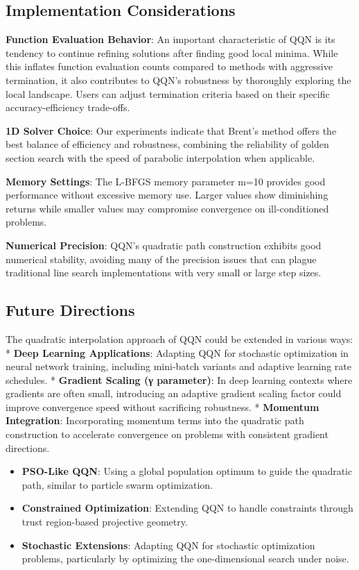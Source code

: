 \hypertarget{implementation-considerations}{%
\subsection{Implementation Considerations}\label{implementation-considerations}}

\textbf{Function Evaluation Behavior}: An important characteristic of QQN is its tendency to continue refining solutions after finding good local minima.
While this inflates function evaluation counts compared to methods with aggressive termination, it also contributes to QQN's robustness by thoroughly exploring the local landscape.
Users can adjust termination criteria based on their specific accuracy-efficiency trade-offs.

\textbf{1D Solver Choice}: Our experiments indicate that Brent's method offers the best balance of efficiency and robustness, combining the reliability of golden section search with the speed of parabolic interpolation when applicable.

\textbf{Memory Settings}: The L-BFGS memory parameter m=10 provides good performance without excessive memory use.
Larger values show diminishing returns while smaller values may compromise convergence on ill-conditioned problems.

\textbf{Numerical Precision}: QQN's quadratic path construction exhibits good numerical stability, avoiding many of the precision issues that can plague traditional line search implementations with very small or large step sizes.

\hypertarget{future-directions}{%
\subsection{Future Directions}\label{future-directions}}

The quadratic interpolation approach of QQN could be extended in various ways:
* \textbf{Deep Learning Applications}: Adapting QQN for stochastic optimization in neural network training, including mini-batch variants and adaptive learning rate schedules.
* \textbf{Gradient Scaling (γ parameter)}: In deep learning contexts where gradients are often small, introducing an adaptive gradient scaling factor could improve convergence speed without sacrificing robustness.
* \textbf{Momentum Integration}: Incorporating momentum terms into the quadratic path construction to accelerate convergence on problems with consistent gradient directions.

\begin{itemize}
\tightlist
\item
  \textbf{PSO-Like QQN}: Using a global population optimum to guide the quadratic path, similar to particle swarm optimization.
\item
  \textbf{Constrained Optimization}: Extending QQN to handle constraints through trust region-based projective geometry.
\item
  \textbf{Stochastic Extensions}: Adapting QQN for stochastic optimization problems, particularly by optimizing the one-dimensional search under noise.
\end{itemize}

